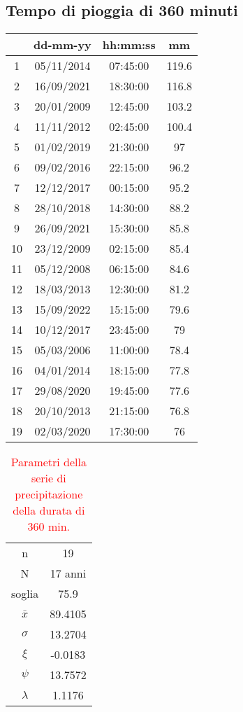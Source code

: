 \subsection{Tempo di pioggia di 360 minuti}
\begin{table}[H] \centering
    \begin{tabular}{cccc}
    \toprule
       & dd-mm-yy   & hh:mm:ss & mm  \\
    \midrule
    1  & 05/11/2014 & 07:45:00 & 119.6 \\
    2  & 16/09/2021 & 18:30:00 & 116.8 \\
    3  & 20/01/2009 & 12:45:00 & 103.2 \\
    4  & 11/11/2012 & 02:45:00 & 100.4 \\
    5  & 01/02/2019 & 21:30:00 & 97    \\
    6  & 09/02/2016 & 22:15:00 & 96.2  \\
    7  & 12/12/2017 & 00:15:00 & 95.2  \\
    8  & 28/10/2018 & 14:30:00 & 88.2  \\
    9  & 26/09/2021 & 15:30:00 & 85.8  \\
    10 & 23/12/2009 & 02:15:00 & 85.4  \\
    11 & 05/12/2008 & 06:15:00 & 84.6  \\
    12 & 18/03/2013 & 12:30:00 & 81.2  \\
    13 & 15/09/2022 & 15:15:00 & 79.6  \\
    14 & 10/12/2017 & 23:45:00 & 79    \\
    15 & 05/03/2006 & 11:00:00 & 78.4  \\
    16 & 04/01/2014 & 18:15:00 & 77.8  \\
    17 & 29/08/2020 & 19:45:00 & 77.6  \\
    18 & 20/10/2013 & 21:15:00 & 76.8  \\
    19 & 02/03/2020 & 17:30:00 & 76    \\
    \bottomrule
    \end{tabular}
    \end{table}

    \begin{table}[H] \centering
        \caption{\textcolor{red}{Parametri della serie di precipitazione della durata di 360 min.}}
        \begin{tabular}{cc}
            \toprule
        n        &   19      \\
        N        & 17 anni \\
        soglia   &   75.9      \\
        $\bar{x}$ &    89.4105    \\
        $\sigma$ &     13.2704    \\
        $\xi$      &     -0.0183  \\
        $\psi$      &  13.7572   \\
        $\lambda$   &   1.1176 \\
    \bottomrule    
    \end{tabular}
        \end{table}

